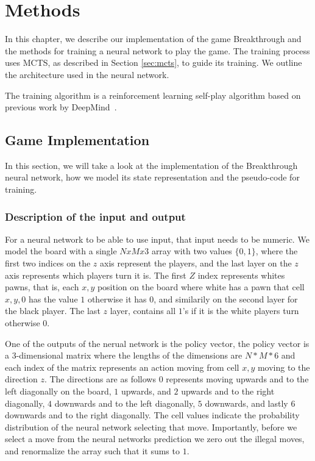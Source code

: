 \chapter{Methods\label{cha:methods}}

In this chapter, we describe our implementation of the game Breakthrough and the methods for training a neural network to play the game. The training process uses MCTS, as described in Section \ref{sec:mcts}, to guide its training. We outline the architecture used in the neural network.

The training algorithm is a reinforcement learning self-play algorithm based on previous work by DeepMind~\cite{silver:alphagozero}.

\section{Game Implementation}

In this section, we will take a look at the implementation of the Breakthrough neural network, how we model its state representation and the pseudo-code for training.

\subsection{Description of the input and output}

For a neural network to be able to use input, that input needs to be numeric. We model the board with a single $NxMx3$ array with two values $\{0,1\}$, where the first two indices on the $z$ axis represent the players, and the last layer on the $z$ axis represents which players turn it is. The first $Z$ index represents whites pawns, that is, each $x,y$ position on the board where white has a pawn that cell $x,y,0$ has the value $1$ otherwise it has $0$, and similarily on the second layer for the black player. The last $z$ layer, contains all $1$'s if it is the white players turn otherwise $0$.

One of the outputs of the nerual network is the policy vector, the policy vector is a $3$-dimensional matrix where the lengths of the dimensions are $N * M * 6$ and each index of the matrix represents an action moving from cell $x,y$ moving to the direction $z$. The directions are as follows $0$ represents moving upwards and to the left diagonally on the board, $1$ upwards, and $2$ upwards and to the right diagonally, $4$ downwards and to the left diagonally, $5$ downwards, and lastly $6$ downwards and to the right diagonally. The cell values indicate the probability distribution of the neural network selecting that move. Importantly, before we select a move from the neural networks prediction we zero out the illegal moves, and renormalize the array such that it sums to $1$.

